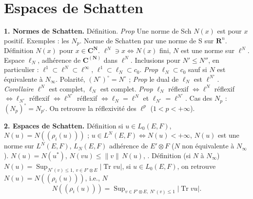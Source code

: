 \documentclass[11pt,a4paper]{article}
\begin{document}
\section{Espaces de Schatten}


\textbf{1. Normes de Schatten.} Définition. \emph{Prop} Une norme de Sch $N(x)$ est  pour $x$ positif. Exemples : les $N_p$. Norme de Schatten  par une norme de S sur $\mathbf{R}^n$. Définition $N(x)$ pour $x \in \mathbf{C}^{\mathbf{N}}$. $\ell^N \ni x \iff N(x)$ fini, $N$ est une norme sur $\ell^N$. Espace $\ell_N$, adhérence de $\mathbf{C}^{(\mathbf{N})}$ dans $\ell^N$. Inclusions pour $N' \leq N''$, en particulier : $\ell^1 \subset \ell^N \subset \ell^\infty$, $\ell^1 \subset \ell_N \subset c_0$. \emph{Prop} $\ell_N \subset c_0$ sauf si $N$ est équivalente à $N_\infty$. Polarité, $(N^{\circ})^{\circ} = N^{\circ}$  ; \emph{Prop} le dual de $\ell_N$ est $\ell^{N^{\circ}}$. \emph{Corollaire} $\ell^N$ est complet, $\ell_N$ est complet. \emph{Prop} $\ell_N$ réflexif $\iff \ell^N$ réflexif $\iff \ell_{N^{\circ}}$ réflexif $\iff \ell^{N^{\circ}}$ réflexif $\iff \ell_N = \ell^N$ et $\ell_{N^{\circ}} = \ell^{N^{\circ}}$.  Cas des $N_p$ :  $(N_p)^{\circ} = N_{p'}$. On retrouve la réflexivité des $\ell^p$ ($1 < p < +\infty$).

\textbf{2. Espaces de Schatten.} Définition si $u \in L_0(E,F)$, \struck{$\Longrightarrow$} $N(u) = N((\rho_i(u)))$ ; \struck{\ill{}} $u \in L^N(E,F) \iff N(u) < +\infty$, $N(u)$ est une norme sur $L^N(E,F)$, $L_N(E,F)$ adhérence de $E' \otimes F$ ($N$ non équivalente à $N_\infty$). $N(u) = N(u^{*})$, $N(vu) \leq \|v\|\,N(u)$, . Définition (si $N$  à $N_\infty$) $N(u) = \operatorname{Sup}_{N^{\circ}(v) \leq 1,\ v \in F' \otimes E} |\operatorname{Tr} vu|$, si $u \in L_0(E,F)$, on retrouve $N(u) = N((\rho_i(u)))$, i.e.,  $N$
\[
  N((\rho_i(u))) = \operatorname{Sup}_{v \in F' \otimes E,\ N^{\circ}(v) \leq 1} |\operatorname{Tr} vu| .
\]
\end{document}
